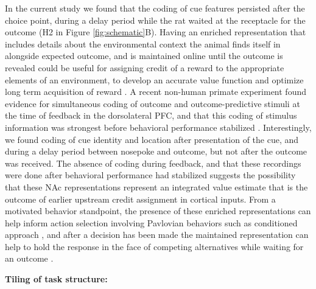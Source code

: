 \documentclass[11pt]{article}
\let\cite=\citep
\begin{document}
{In the current study we found that the coding of cue features persisted after the choice point, during a delay period while the rat waited at the receptacle for the outcome (H2 in Figure \ref{fig:schematic}B). Having an enriched representation that includes details about the environmental context the animal finds itself in alongside expected outcome, and is maintained online until the outcome is revealed could be useful for assigning credit of a reward to the appropriate elements of an environment, to develop an accurate value function and optimize long term acquisition of reward \cite{Lee2012}. A recent non-human primate experiment found evidence for simultaneous coding of outcome and outcome-predictive stimuli at the time of feedback in the dorsolateral PFC, and that this coding of stimulus information was strongest before behavioral performance stabilized \cite{Asaad2017}. Interestingly, we found coding of cue identity and location after presentation of the cue, and during a delay period between nosepoke and outcome, but not after the outcome was received. The absence of coding during feedback, and that these recordings were done after behavioral performance had stabilized suggests the possibility that these NAc representations represent an integrated value estimate that is the outcome of earlier upstream credit assignment in cortical inputs. From a motivated behavior standpoint, the presence of these enriched representations can help inform action selection involving Pavlovian behaviors such as conditioned approach \cite{DiCiano2001,Parkinson2000,Saunders2012}, and after a decision has been made the maintained representation can help to hold the response in the face of competing alternatives while waiting for an outcome \cite{DiCiano2008,Floresco2008,Floresco2015,Peters2008}.

{\bf Tiling of task structure:}

}
\end{document}
